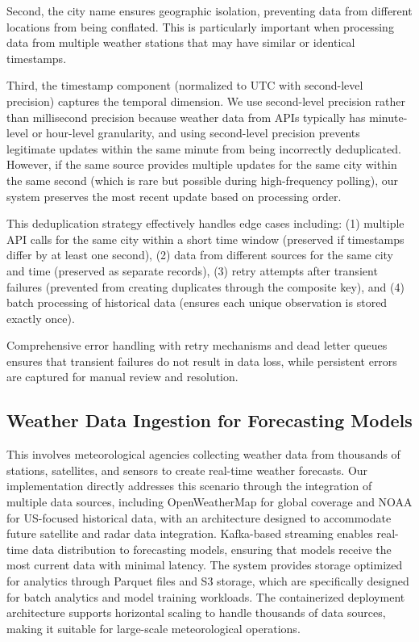 \documentclass[12pt,a4paper]{article}
\begin{document}
Second, the city name ensures geographic isolation, preventing data from different locations from being conflated. This is particularly important when processing data from multiple weather stations that may have similar or identical timestamps.

Third, the timestamp component (normalized to UTC with second-level precision) captures the temporal dimension. We use second-level precision rather than millisecond precision because weather data from APIs typically has minute-level or hour-level granularity, and using second-level precision prevents legitimate updates within the same minute from being incorrectly deduplicated. However, if the same source provides multiple updates for the same city within the same second (which is rare but possible during high-frequency polling), our system preserves the most recent update based on processing order.

This deduplication strategy effectively handles edge cases including: (1) multiple API calls for the same city within a short time window (preserved if timestamps differ by at least one second), (2) data from different sources for the same city and time (preserved as separate records), (3) retry attempts after transient failures (prevented from creating duplicates through the composite key), and (4) batch processing of historical data (ensures each unique observation is stored exactly once).

Comprehensive error handling with retry mechanisms and dead letter queues ensures that transient failures do not result in data loss, while persistent errors are captured for manual review and resolution.

\subsection{Weather Data Ingestion for Forecasting Models}


This involves meteorological agencies collecting weather data from thousands of stations, satellites, and sensors to create real-time weather forecasts. Our implementation directly addresses this scenario through the integration of multiple data sources, including OpenWeatherMap for global coverage and NOAA for US-focused historical data, with an architecture designed to accommodate future satellite and radar data integration. Kafka-based streaming enables real-time data distribution to forecasting models, ensuring that models receive the most current data with minimal latency. The system provides storage optimized for analytics through Parquet files and S3 storage, which are specifically designed for batch analytics and model training workloads. The containerized deployment architecture supports horizontal scaling to handle thousands of data sources, making it suitable for large-scale meteorological operations.
\end{document}
